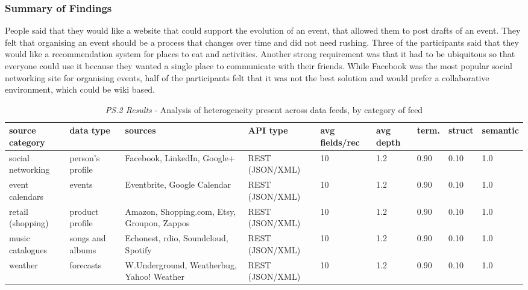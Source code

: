 \documentclass{sigchi}
\begin{document}
\subsubsection{Summary of Findings}
People said that they would like a website that could support the evolution of an event, that allowed them to post drafts of an event.  They felt that organising an event should be a process that changes over time and did not need rushing.  Three of the participants said that they would like a recommendation system for places to eat and activities. Another strong requirement was that it had to be ubiquitous so that everyone could use it because they wanted a single place to communicate with their friends.  While Facebook was the most popular social networking site for organising events, half of the participants felt that it was not the best solution and would prefer a collaborative environment, which could be wiki based.


\begin{table}
\small
\begin{tabular}{| p{2.0cm} | p{1.5cm} | p{3.6cm} | p{2cm} | p{2cm} | l | l | l | l |}
\hline
source category  & data type & sources & API type & avg fields/rec & avg depth & term. & struct & semantic \\
\hline
social networking  & person's profile & Facebook, LinkedIn, Google+ & REST (JSON/XML) & 10 & 1.2 & 0.90 & 0.10 & 1.0 \\
event calendars & events & Eventbrite, Google Calendar  & REST (JSON/XML) & 10 & 1.2 & 0.90 & 0.10 & 1.0 \\
retail (shopping)  & product profile & Amazon, Shopping.com, Etsy, Groupon, Zappos  & REST (JSON/XML) & 10 & 1.2 & 0.90 & 0.10 & 1.0 \\
music catalogues & songs and albums & Echonest, rdio, Soundcloud, Spotify  & REST (JSON/XML) & 10 & 1.2 & 0.90 & 0.10 & 1.0 \\
weather & forecasts & W.Underground, Weatherbug, Yahoo! Weather & REST (JSON/XML) & 10 & 1.2 & 0.90 & 0.10 & 1.0 \\
\hline
\end{tabular}
\caption{\emph{PS.2 Results} - Analysis of heterogeneity present across data feeds, by category of feed}\label{tbl:prestudy2}

\end{table}
\end{document}
